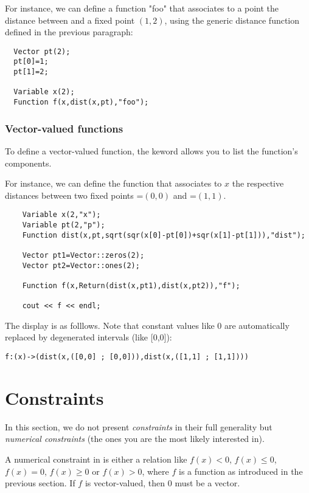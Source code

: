For instance, we can define a function "foo" that associates to
a point  the distance between  and a fixed point $(1,2)$,
using the generic distance function defined in the previous paragraph:

\begin{lstlisting}
  Vector pt(2);
  pt[0]=1;
  pt[1]=2;

  Variable x(2);
  Function f(x,dist(x,pt),"foo");
\end{lstlisting}

\subsubsection{Vector-valued functions}

To define a vector-valued function, the  keword allows
you to list the function's components.

For instance, we can define the function that associates to $x$ the 
respective distances between two fixed points =$(0,0)$ and =$(1,1)$.

\begin{lstlisting}	
	Variable x(2,"x");
	Variable pt(2,"p");
	Function dist(x,pt,sqrt(sqr(x[0]-pt[0])+sqr(x[1]-pt[1])),"dist");

	Vector pt1=Vector::zeros(2);
	Vector pt2=Vector::ones(2);

	Function f(x,Return(dist(x,pt1),dist(x,pt2)),"f");

	cout << f << endl;
\end{lstlisting}

The display is as folllows. Note that constant values like 0 are automatically replaced
by degenerated intervals (like [0,0]):
\begin{verbatim}
f:(x)->(dist(x,([0,0] ; [0,0])),dist(x,([1,1] ; [1,1])))
\end{verbatim}

\section{Constraints}

In this section, we do not present {\it constraints} in their full generality
but {\it numerical constraints} (the ones you are the most likely interested in).

A numerical constraint in \ibex is either a relation like 
$f(x)<0$, $f(x)\le0$, $f(x)=0$, $f(x)\ge0$ or $f(x)>0$,
where $f$ is a function as introduced in the previous section. If $f$ is vector-valued, then
$0$ must be a vector.

